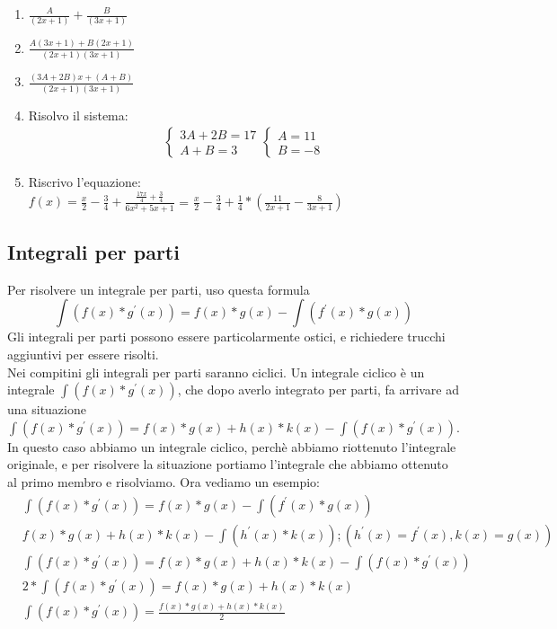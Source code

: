 \documentclass[11pt]{article}
\begin{document}
\begin{enumerate}
    \item $\frac{A}{(2x+1)} + \frac{B}{(3x+1)}$\\
    \item $\frac{A(3x+1)+B(2x+1)}{(2x+1)(3x+1)}$\\
    \item $\frac{(3A+2B)x + (A+B)}{(2x+1)(3x+1)}$\\
    \item Risolvo il sistema:\\
    \begin{align*}
        \begin{cases}
            3A+2B = 17\\
            A+B = 3
        \end{cases}
        \begin{cases}
            A = 11\\
            B = -8
        \end{cases}
    \end{align*}
    \item Riscrivo l'equazione:\\
    $f(x) = \frac{x}{2} - \frac{3}{4} + \frac{\frac{17x}{4} + \frac{3}{4}}{6x^2+5x+1}$ = $\frac{x}{2} - \frac{3}{4} + \frac{1}{4} * \left(\frac{11}{2x+1} - \frac{8}{3x+1}\right)$\\
\end{enumerate}
\subsection{Integrali per parti}
Per risolvere un integrale per parti, uso questa formula $$\int(f(x)*g^{'}(x)) = f(x)*g(x) - \int(f^{'}(x)*g(x)) $$
Gli integrali per parti possono essere particolarmente ostici, e richiedere trucchi aggiuntivi per essere risolti.\\
Nei compitini gli integrali per parti saranno ciclici. Un integrale ciclico è un integrale $\int(f(x)*g^{'}(x))$, che dopo averlo integrato per parti, 
fa arrivare ad una situazione $\int(f(x)*g^{'}(x)) = f(x)*g(x) + h(x)*k(x) - \int(f(x)*g^{'}(x))$.\\
In questo caso abbiamo un integrale ciclico, perchè abbiamo riottenuto l'integrale originale, e per risolvere la situazione portiamo l'integrale che abbiamo ottenuto al primo membro e risolviamo. Ora vediamo un esempio:\\
\begin{align*}
    &\int(f(x)*g^{'}(x)) = f(x)*g(x) - \int(f^{'}(x)*g(x))\\
    &f(x)*g(x) + h(x)*k(x) - \int(h^{'}(x)*k(x)) ; (h^{'}(x) = f^{'}(x) , k(x) = g(x))\\
    &\int(f(x)*g^{'}(x)) = f(x)*g(x) + h(x)*k(x) - \int(f(x)*g^{'}(x))\\
    &2*\int(f(x)*g^{'}(x)) = f(x)*g(x) + h(x)*k(x)\\
    &\int(f(x)*g^{'}(x)) = \frac{f(x)*g(x) + h(x)*k(x)}{2}
\end{align*}
\end{document}
